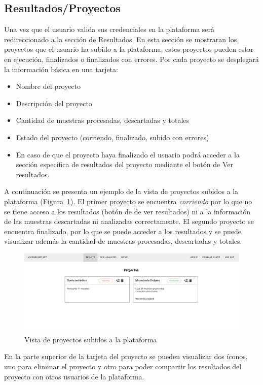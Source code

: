 \subsection{Resultados/Proyectos} \label{projects}
Una vez que el usuario valida sus credenciales en la plataforma será redireccionado a la sección de Resultados. En esta sección se mostraran los proyectos que el usuario ha subido a la plataforma, estos proyectos pueden estar en ejecución, finalizados o finalizados con errores. 
Por cada proyecto se desplegará la información básica en una tarjeta:
\begin{itemize}
    \item Nombre del proyecto
    \item Descripción del proyecto
    \item Cantidad de muestras procesadas, descartadas y totales
    \item Estado del proyecto (corriendo, finalizado, subido con errores)
    \item En caso de que el proyecto haya finalizado el usuario podrá acceder a la sección especifica de resultados del proyecto mediante el botón de Ver resultados.
\end{itemize}

A continuación se presenta un ejemplo de la vista de proyectos subidos a la plataforma (Figura~\ref{fig:app-results-projects}).
El primer proyecto se encuentra \textit{corriendo} por lo que no se tiene acceso a los resultados (botón de de ver resultados) ni a la información de las muestras descartadas ni analizadas correctamente.
El segundo proyecto se encuentra finalizado, por lo que se puede acceder a los resultados y se puede visualizar además la cantidad de muestras procesadas, descartadas y totales. 

\begin{figure}[H]
    \includegraphics[width=1\linewidth]{images/app/projects.png}

    \caption{Vista de proyectos subidos a la plataforma}
    \label{fig:app-results-projects}
\end{figure}
En la parte superior de la tarjeta del proyecto se pueden visualizar dos íconos, uno para eliminar el proyecto y otro para poder compartir los resultados del proyecto con otros usuarios de la plataforma.


